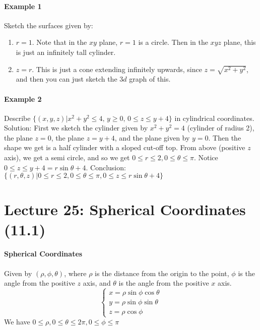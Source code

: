 \documentclass[tikz,10pt,letter]{article}
\theoremstyle{plain}
\theoremstyle{definition}
\begin{document}
\paragraph{Example 1}
Sketch the surfaces given by:
\begin{enumerate}
    \item $r=1$. Note that in the $xy$ plane, $r=1$ is a circle. Then in the $xyz$ plane, this is just an infinitely tall cylinder.  
    \item $z=r$. This is just a cone extending infinitely upwards, since $z=\sqrt{x^2+y^2}$, and then you can just sketch the $3d$ graph of this. 
\end{enumerate} 

\paragraph{Example 2}
Describe $\lbrace(x,y,z)|x^2+y^2\leq4,\,y\geq0,\,0\leq z\leq y+4\rbrace$ in cylindrical coordinates. \\ 
Solution: First we sketch the cylinder given by $x^2+y^2=4$ (cylinder of radius 2), the plane $z=0$, the plane $z=y+4$, and the plane given by $y=0$. Then the shape we get is a half cylinder with a sloped cut-off top. From above (positive $z$ axis), we get a semi circle, and so we get $0\leq r\leq 2,0\leq\theta\leq\pi$. Notice $0\leq z\leq y+4=r\sin\theta+4$. Conclusion: $\lbrace(r,\theta,z)|0\leq r\leq2,0\leq\theta\leq\pi,0\leq z\leq r\sin\theta+4\rbrace$

\section*{Lecture 25: Spherical Coordinates (11.1)}
\paragraph{Spherical Coordinates}
Given by $(\rho,\phi,\theta)$, where $\rho$ is the distance from the origin to the point, $\phi$ is the angle from the positive $z$ axis, and $\theta$ is the angle from the positive $x$ axis.$$\begin{cases}x=\rho\sin\phi\cos\theta\\y=\rho\sin\phi\sin\theta\\z=\rho\cos\phi\end{cases}$$ We have $0\leq\rho,0\leq\theta\leq2\pi,0\leq\phi\leq\pi$
\end{document}
